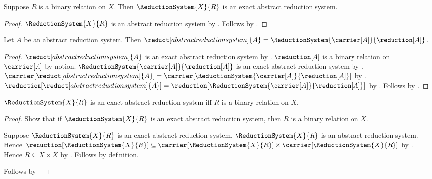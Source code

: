 \begin{theorem}\label{reduction_system_from_relation_is_exact}
    Suppose $R$ is a binary relation on $X$.
    Then $\ReductionSystem{X}{R}$ is an exact abstract reduction system.
\end{theorem}
\begin{proof}
    $\ReductionSystem{X}{R}$ is an abstract reduction system by
        .
    Follows by .
\end{proof}

\begin{theorem}\label{abstract_reduction_system_reduct_eq}
    Let $A$ be an abstract reduction system.
    Then $\reduct[abstract reduction system]{A}
        =\ReductionSystem{\carrier[A]}{\reduction[A]}$.
\end{theorem}
\begin{proof}
    $\reduct[abstract reduction system]{A}$ is an exact abstract reduction
        system by .
    $\reduction[A]$ is a binary relation on $\carrier[A]$ by notion.
    $\ReductionSystem{\carrier[A]}{\reduction[A]}$ is an exact abstract
        reduction system by .
    $\carrier[\reduct[abstract reduction system]{A}]=
        \carrier[\ReductionSystem{\carrier[A]}{\reduction[A]}]$
        by .
    $\reduction[\reduct[abstract reduction system]{A}]=
        \reduction[\ReductionSystem{\carrier[A]}{\reduction[A]}]$
        by .
    Follows by .
\end{proof}

\begin{theorem}\label{reduction_system_from_relation_is_exact_iff}
    $\ReductionSystem{X}{R}$ is an exact abstract reduction system iff
        $R$ is a binary relation on $X$.
\end{theorem}
\begin{proof}
    Show that if $\ReductionSystem{X}{R}$ is an exact abstract reduction
        system, then $R$ is a binary relation on $X$.
    \begin{subproof}
        Suppose $\ReductionSystem{X}{R}$ is an exact abstract reduction
            system.
        $\ReductionSystem{X}{R}$ is an abstract reduction system.
        Hence $\reduction[\ReductionSystem{X}{R}]\subseteq
            \carrier[\ReductionSystem{X}{R}]\times
            \carrier[\ReductionSystem{X}{R}]$
            by .
        Hence $R\subseteq X\times X$ by
            .
        Follows by definition.
    \end{subproof}
    Follows by .
\end{proof}


